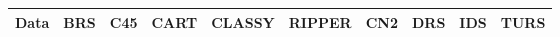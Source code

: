 \begin{table}[ht]
\small
\centering
\begin{tabular}{l|llllllll|l}
  \hline
Data & BRS & C45 & CART & CLASSY & RIPPER & CN2 & DRS & IDS & TURS \\ 
  \hline

\end{tabular}
\end{table}
